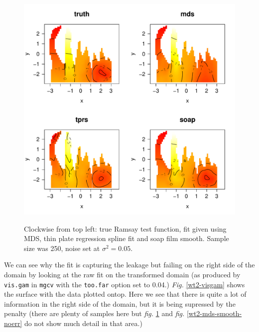 \documentclass[a4paper,10pt]{article}
\newcommand{\fig}[1]{\emph{fig.} \ref{#1}}
\newcommand{\Fig}[1]{\emph{Fig.} \ref{#1}}
\begin{document}
\begin{figure}
\centering
\includegraphics[width=6in]{figs/wt2-mds-smooth-err.pdf}\\
\caption{Clockwise from top left: true Ramsay test function, fit given using MDS, thin plate regression spline fit and soap film smooth. Sample size was 250, noise set at $\sigma^2=0.05$.}
\label{wt2-mds-smooth-err}
\end{figure}

We can see why the fit is capturing the leakage but failing on the right side of the domain by looking at the raw fit on the transformed domain (as produced by \texttt{vis.gam} in \texttt{mgcv} with the \texttt{too.far} option set to 0.04.) \Fig{wt2-visgam} shows the surface with the data plotted ontop. Here we see that there is quite a lot of information in the right side of the domain, but it is being supressed by the penalty (there are plenty of samples here but \fig{wt2-mds-smooth-err} and \fig{wt2-mds-smooth-noerr} do not show much detail in that area.)
\end{document}
